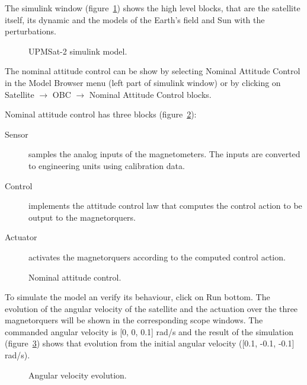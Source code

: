 The simulink window (figure~\ref{fig:acs-simulink}) shows the high level blocks, that are the satellite itself, its dynamic and the models of the Earth's field and Sun with the perturbations.

\begin{figure}[h]
            \caption{UPMSat-2 simulink model.}
            \label{fig:acs-simulink}
\end{figure}

The nominal attitude control can be show by selecting Nominal Attitude Control in the Model Browser menu (left part of simulink window) or by clicking on Satellite $\rightarrow$ OBC $\rightarrow$ Nominal Attitude Control blocks.

Nominal attitude control has three blocks (figure~\ref{fig:nac}):
\begin{description}
\item[Sensor] samples the analog inputs of the magnetometers. The inputs are converted to engineering units using calibration data.
\item[Control] implements the attitude control law that computes the control action to be output to the magnetorquers.
\item[Actuator] activates the magnetorquers according to the computed control action.
\end{description}

\begin{figure}[H]
            \caption{Nominal attitude control.}
            \label{fig:nac}
\end{figure}

To simulate the model an verify its behaviour, click on Run bottom. The evolution of the angular velocity of the satellite and the actuation over the three magnetorquers will be shown in the corresponding scope windows. The commanded angular velocity is [0, 0, 0.1] rad/s and the result of the simulation (figure~\ref{fig:scope}) shows that evolution from the initial angular velocity ([0.1, -0.1, -0.1] rad/s).

\begin{figure}[h]
            \caption{Angular velocity evolution.}

            \label{fig:scope}
\end{figure}

